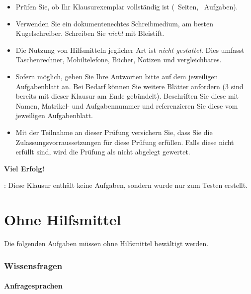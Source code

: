 \documentclass[exam, sectionseven, german]{acAssignment}
\begin{document}
\maketitle

\acExamForm

\begin{itemize}[itemsep=0pt]
    \item Prüfen Sie, ob Ihr Klausurexemplar vollständig ist (\acNumPages~Seiten, \acNumTasks~Aufgaben).
    \item Verwenden Sie ein dokumentenechtes Schreibmedium, am besten Kugelschreiber.
        Schreiben Sie \emph{nicht} mit Bleistift.
    \item Die Nutzung von Hilfsmitteln jeglicher Art ist \emph{nicht gestattet}.
        Dies umfasst Taschenrechner, Mobiltelefone, Bücher, Notizen und vergleichbares.
    \item Sofern möglich, geben Sie Ihre Antworten bitte auf dem jeweiligen Aufgabenblatt an.
        Bei Bedarf können Sie weitere Blätter anfordern (3 sind bereits mit dieser Klausur am Ende gebündelt).
        Beschriften Sie diese mit Namen, Matrikel- und Aufgabennummer und referenzieren Sie diese vom jeweiligen Aufgabenblatt.
    \item Mit der Teilnahme an dieser Prüfung versichern Sie, dass Sie die Zulassungsvorraussetzungen für diese Prüfung erfüllen.
        Falls diese nicht erfüllt sind, wird die Prüfung als nicht abgelegt gewertet.
\end{itemize}

\vspace{0.1cm}
\textbf{Viel Erfolg!}

\vfill

\acNote:
Diese Klausur enthält keine Aufgaben, sondern wurde nur zum Testen erstellt.

\part{Ohne Hilfsmittel}
Die folgenden Aufgaben müssen ohne Hilfsmittel bewältigt werden.

\section{Wissensfragen}

\subsection{Anfragesprachen}
\end{document}
